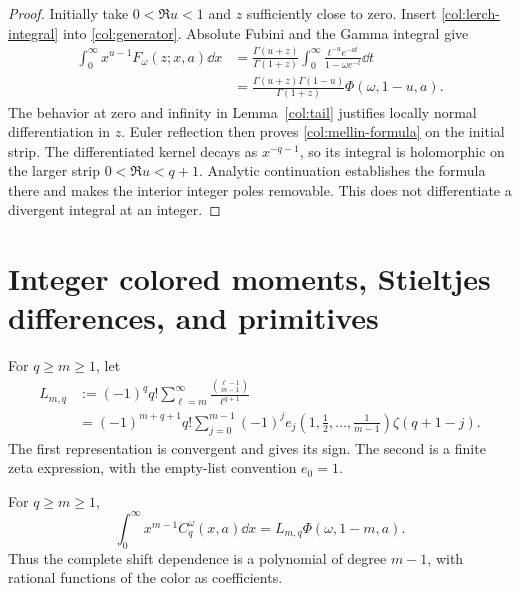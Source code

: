 \begin{proof}
Initially take $0<\Re u<1$ and $z$ sufficiently close to zero.
Insert \eqref{col:lerch-integral} into \eqref{col:generator}.
Absolute Fubini and the Gamma integral give
\begin{align*}
 \int_0^\infty x^{u-1}F_\omega(z;x,a)\dd x
 &=\frac{\Gamma(u+z)}{\Gamma(1+z)}
       \int_0^\infty\frac{t^{-u}e^{-at}}{1-\omega e^{-t}}\dd t\\
 &=\frac{\Gamma(u+z)\Gamma(1-u)}{\Gamma(1+z)}
                  \Phi(\omega,1-u,a).
\end{align*}
The behavior at zero and infinity in Lemma~\ref{col:tail}
justifies locally normal differentiation in $z$.
Euler reflection then proves \eqref{col:mellin-formula}
on the initial strip. The differentiated kernel decays as
$x^{-q-1}$, so its integral is holomorphic on the larger
strip $0<\Re u<q+1$. Analytic continuation establishes the
formula there and makes the interior integer poles removable.
This does not differentiate a divergent integral at an integer.
\end{proof}

\section{Integer colored moments, Stieltjes differences, and primitives}
\label{sec:colored-integer}

For $q\ge m\ge1$, let
\begin{align}
 L_{m,q}
 &:=(-1)^q q!\sum_{\ell=m}^\infty
              \frac{\binom{\ell-1}{m-1}}{\ell^{q+1}}
 \label{col:L-positive}\\
 &=(-1)^{m+q+1}q!
       \sum_{j=0}^{m-1}(-1)^j e_j(1,\tfrac12,\ldots,\tfrac1{m-1})
                         \zeta(q+1-j).\label{col:L-finite}
\end{align}
The first representation is convergent and gives its sign.
The second is a finite zeta expression, with the empty-list convention
$e_0=1$.

\begin{theorem}\label{col:integer}
For $q\ge m\ge1$,
\begin{equation}\label{col:integer-formula}
 \boxed{\displaystyle
 \int_0^\infty x^{m-1}C_q^\omega(x,a)\dd x
             =L_{m,q}\Phi(\omega,1-m,a).}
\end{equation}
Thus the complete shift dependence is a polynomial of degree
$m-1$, with rational functions of the color as coefficients.
\end{theorem}

